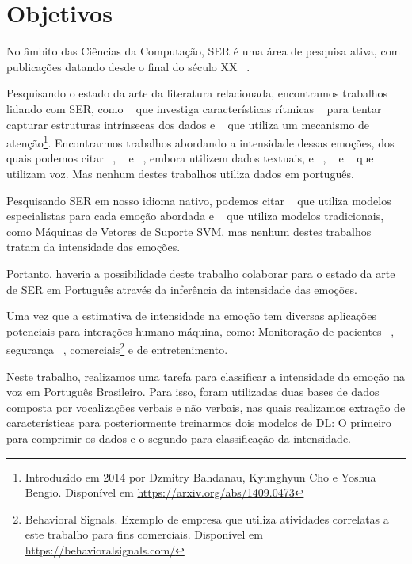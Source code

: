 \section{Objetivos}

No âmbito das Ciências da Computação, \acrshort{SER} é uma área de pesquisa ativa, com publicações datando desde o final do século XX ~\cite{12.27}.

Pesquisando o estado da arte da literatura relacionada, encontramos trabalhos lidando com \acrshort{SER}, como ~\cite{11} que investiga características rítmicas ~\cite{34} para tentar capturar estruturas intrínsecas dos dados e ~\cite{32.95} que utiliza um mecanismo de atenção\footnote{Introduzido em 2014 por Dzmitry Bahdanau, Kyunghyun Cho e Yoshua Bengio. Disponível em \url{https://arxiv.org/abs/1409.0473}}. Encontrarmos trabalhos abordando a intensidade dessas emoções, dos quais podemos citar ~\cite{14}, ~\cite{15} e ~\cite{28}, embora utilizem dados textuais, e ~\cite{3}, ~\cite{18} e ~\cite{20} que utilizam voz. Mas nenhum destes trabalhos utiliza dados em português.

Pesquisando \acrshort{SER} em nosso idioma nativo, podemos citar ~\cite{12} que utiliza modelos especialistas para cada emoção abordada e ~\cite{21} que utiliza modelos tradicionais, como Máquinas de Vetores de Suporte \acrfull{SVM}, mas nenhum destes trabalhos tratam da intensidade das emoções.

Portanto, haveria a possibilidade deste trabalho colaborar para o estado da arte de \acrshort{SER} em Português através da inferência da intensidade das emoções.

Uma vez que a estimativa de intensidade na emoção tem diversas aplicações potenciais para interações humano máquina, como: Monitoração de pacientes ~\cite{1}, segurança ~\cite{4}, comerciais\footnote{Behavioral Signals. Exemplo de empresa que utiliza atividades correlatas a este trabalho para fins comerciais. Disponível em \url{https://behavioralsignals.com/}} e de entretenimento.

Neste trabalho, realizamos uma tarefa para classificar a intensidade da emoção na voz em Português Brasileiro. Para isso, foram utilizadas duas bases de dados composta por vocalizações verbais e não verbais, nas quais realizamos extração de características para posteriormente treinarmos dois modelos de \acrshort{DL}: O primeiro para comprimir os dados e o segundo para classificação da intensidade.


